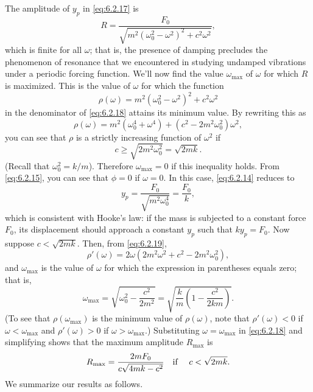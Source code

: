 The amplitude of $y_{p}$ in \eqref{eq:6.2.17} is
\begin{equation}
  \label{eq:6.2.18}R=\frac{F_{0}}{\sqrt{m^{2}(\omega^{2}_{0}-\omega^{2})^{2}+c^{2}\omega^{2}}},
\end{equation}
which is finite for all $\omega$; that is, the presence of damping precludes the phenomenon of
resonance that we encountered in studying undamped vibrations under a periodic forcing function.
We'll now find the value $\omega_{\max}$ of $\omega$ for which $R$ is maximized. This is the value
of $\omega$ for which the function
\[
  \rho(\omega)=m^{2}(\omega^{2}_{0}-\omega^{2})^{2}+c^{2}\omega^{2}
\]
in the denominator of \eqref{eq:6.2.18} attains its minimum value. By rewriting this as
\begin{equation}
  \label{eq:6.2.19}\rho(\omega)=m^{2}(\omega^{4}_{0}+\omega^{4})+ (c^{2}-2m^{2}\omega^{2}_{0})\omega^{2},
\end{equation}
you can see that $\rho$ is a strictly increasing function of $\omega^{2}$ if
\[
  c\ge\sqrt{2m^{2}\omega^{2}_{0}}=\sqrt{2mk}.
\]
(Recall that $\omega^{2}_{0}=k/m$). Therefore $\omega_{\max}=0$ if this inequality holds. From
\eqref{eq:6.2.15}, you can see that $\phi=0$ if $\omega=0$. In this case, \eqref{eq:6.2.14} reduces
to
\[
  y_{p}=\frac{F_{0}}{\sqrt{m^{2}\omega^{4}_{0}}}=\frac{F_{0}}{k},
\]
which is consistent with Hooke's law: if the mass is subjected to a constant force $F_{0}$, its
displacement should approach a constant $y_{p}$ such that $ky_{p}=F_{0}$. Now suppose
$c<\sqrt{2mk}$. Then, from \eqref{eq:6.2.19},
\[
  \rho'(\omega)=2\omega(2m^{2}\omega^{2}+c^{2}-2m^{2}\omega^{2}_{0}),
\]
and $\omega_{\max}$ is the value of $\omega$ for which the expression in parentheses equals zero;
that is,
\[
  \omega_{\max}=\sqrt{\omega^{2}_{0}-\frac{c^{2}}{2m^{2}}}=\sqrt{\frac{k}{m}\left(1-\frac{c^{2}}{2km}\right)}.
\]
(To see that $\rho(\omega_{\max})$ is the minimum value of $\rho(\omega)$, note that
$\rho'(\omega)<0$ if $\omega <\omega_{\max}$ and $\rho'(\omega)>0$ if $\omega>\omega_{\max}$.)
Substituting $\omega=\omega_{\max}$ in \eqref{eq:6.2.18} and simplifying shows that the maximum
amplitude $R_{\max}$ is
\[
  R_{\max}=\frac{2mF_{0}}{c\sqrt{4mk-c^{2}}}\mbox{\quad if \quad}c< \sqrt{2mk}.
\]
We summarize our results as follows.

